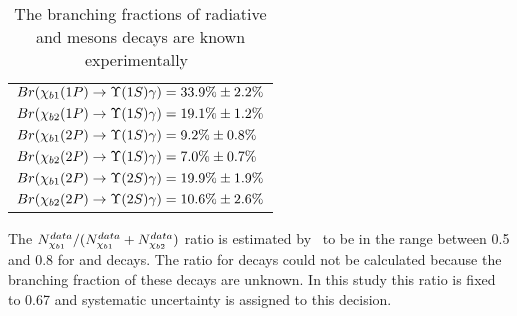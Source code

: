 \begin{table}[H]
\caption{The branching fractions of radiative \chibOneP and \chibTwoP mesons
decays are known experimentally~\cite{PDG2012}}
\centering
\begin{tabular}{l}
$Br(\chiboneOneP \to \Y1S \gamma) = 33.9\% \pm 2.2\%$ \\
$Br(\chibtwoOneP \to \Y1S \gamma) = 19.1\% \pm 1.2\%$ \\
$Br(\chiboneTwoP \to \Y1S \gamma) = 9.2\% \pm 0.8\%$ \\
$Br(\chibtwoTwoP \to \Y1S \gamma)  = 7.0\% \pm 0.7\%$ \\
$Br(\chiboneTwoP \to \Y2S \gamma) = 19.9\% \pm 1.9\%$ \\
$Br(\chibtwoTwoP \to \Y2S \gamma) = 10.6\% \pm 2.6\%$ \\
\end{tabular}
\label{tab:branching}
\end{table}

The $N_{\chi_{b 1}}^{data}/(N_{\chi_{b 1}}^{data} + N_{\chi_{b 2}}^{data})$ ratio is
estimated by~ to be in the range between 0.5 and 0.8 for
\chibOneP and \chibTwoP decays. The ratio for \chibThreeP decays could not be
calculated because the branching fraction of these decays are unknown. In this
study this ratio is fixed to 0.67 and systematic uncertainty is assigned to this
decision. 

% 

